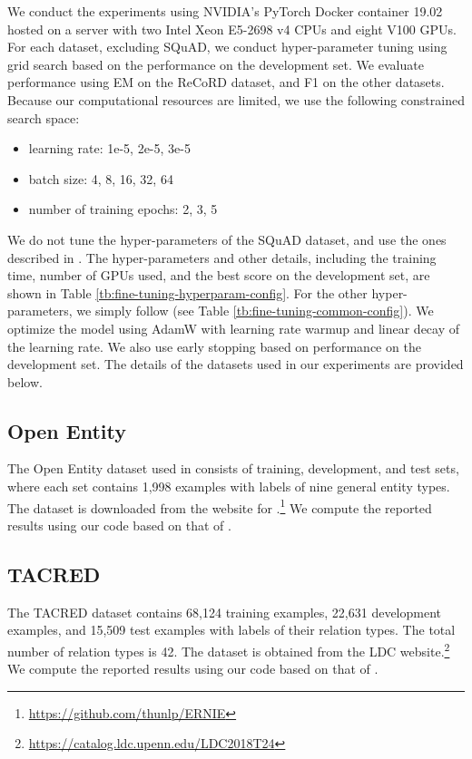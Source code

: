 \documentclass[11pt,a4paper]{article}
\begin{document}
\begin{table}[t]
We conduct the experiments using NVIDIA's PyTorch Docker container 19.02 hosted on a server with two Intel Xeon E5-2698 v4 CPUs and eight V100 GPUs.
For each dataset, excluding SQuAD, we conduct hyper-parameter tuning using grid search based on the performance on the development set.
We evaluate performance using EM on the ReCoRD dataset, and F1 on the other datasets.
Because our computational resources are limited, we use the following constrained search space:
\begin{itemize}[leftmargin=10pt,topsep=1pt,itemsep=0pt]
    \item learning rate: 1e-5, 2e-5, 3e-5
    \item batch size: 4, 8, 16, 32, 64
    \item number of training epochs: 2, 3, 5
\end{itemize}
We do not tune the hyper-parameters of the SQuAD dataset, and use the ones described in .
The hyper-parameters and other details, including the training time, number of GPUs used, and the best score on the development set, are shown in Table \ref{tb:fine-tuning-hyperparam-config}.
For the other hyper-parameters, we simply follow  (see Table \ref{tb:fine-tuning-common-config}).
We optimize the model using AdamW with learning rate warmup and linear decay of the learning rate.
We also use early stopping based on performance on the development set.
The details of the datasets used in our experiments are provided below.

\subsection{Open Entity}

The Open Entity dataset used in  consists of training, development, and test sets, where each set contains 1,998 examples with labels of nine general entity types.
The dataset is downloaded from the website for .\footnote{\url{https://github.com/thunlp/ERNIE}}
We compute the reported results using our code based on that of .

\subsection{TACRED}

The TACRED dataset contains 68,124 training examples, 22,631 development examples, and 15,509 test examples with labels of their relation types.
The total number of relation types is 42.
The dataset is obtained from the LDC website.\footnote{\url{https://catalog.ldc.upenn.edu/LDC2018T24}}
We compute the reported results using our code based on that of .


\end{table}
\end{document}
